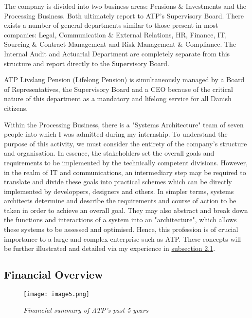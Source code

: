 The company is divided into two business areas: Pensions \& Investments and the Processing Business. Both ultimately report to ATP’s Supervisory Board. There exists a number of general departments similar to those present in most companies: Legal, Communication \& External Relations, HR, Finance, IT, Sourcing \& Contract Management and Risk Management \& Compliance. The Internal Audit and Actuarial Department are completely separate from this structure and report directly to the Supervisory Board.\cite{about_atp}

ATP Livslang Pension (Lifelong Pension) is simultaneously managed by a Board of Representatives, the Supervisory Board and a CEO because of the critical nature of this department as a mandatory and lifelong service for all Danish citizens.\cite{about_atp,anno_report}

Within the Processing Business, there is a "Systems Architecture" team of seven people into which I was admitted during my internship. To understand the purpose of this activity, we must consider the entirety of the company's structure and organisation. In essence, the stakeholders set the overall goals and requirements to be implemented by the technically competent divisions. However, in the realm of IT and communications, an intermediary step may be required to translate and divide these goals into practical schemes which can be directly implemented by developpers, designers and others. In simpler terms, systems architects determine and describe the requirements and course of action to be taken in order to achieve an overall goal. They may also abstract and break down the functions and interactions of a system into an "architecture", which allows these systems to be assessed and optimised.\cite{sys_arch} Hence, this profession is of crucial importance to a large and complex enterprise such as ATP. These concepts will be further illustrated and detailed via my experience in \hyperlink{subsection.2.1}{subsection 2.1}.

\subsection{Financial Overview}

\begin{figure}[H]
    \centering
        \texttt{[image: image5.png]}
        \caption*{\textit{Financial summary of ATP's past 5 years\cite{anno_report}}}
\end{figure}

